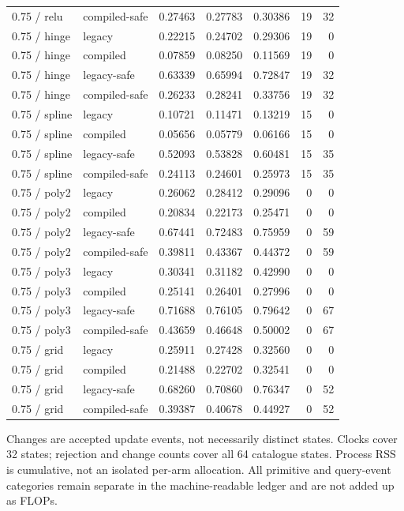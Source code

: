 \begin{longtable}{@{}llrrrrr@{}}
0.75 / relu & compiled-safe & 0.27463 & 0.27783 & 0.30386 & 19 & 32\\
0.75 / hinge & legacy & 0.22215 & 0.24702 & 0.29306 & 19 & 0\\
0.75 / hinge & compiled & 0.07859 & 0.08250 & 0.11569 & 19 & 0\\
0.75 / hinge & legacy-safe & 0.63339 & 0.65994 & 0.72847 & 19 & 32\\
0.75 / hinge & compiled-safe & 0.26233 & 0.28241 & 0.33756 & 19 & 32\\
0.75 / spline & legacy & 0.10721 & 0.11471 & 0.13219 & 15 & 0\\
0.75 / spline & compiled & 0.05656 & 0.05779 & 0.06166 & 15 & 0\\
0.75 / spline & legacy-safe & 0.52093 & 0.53828 & 0.60481 & 15 & 35\\
0.75 / spline & compiled-safe & 0.24113 & 0.24601 & 0.25973 & 15 & 35\\
0.75 / poly2 & legacy & 0.26062 & 0.28412 & 0.29096 & 0 & 0\\
0.75 / poly2 & compiled & 0.20834 & 0.22173 & 0.25471 & 0 & 0\\
0.75 / poly2 & legacy-safe & 0.67441 & 0.72483 & 0.75959 & 0 & 59\\
0.75 / poly2 & compiled-safe & 0.39811 & 0.43367 & 0.44372 & 0 & 59\\
0.75 / poly3 & legacy & 0.30341 & 0.31182 & 0.42990 & 0 & 0\\
0.75 / poly3 & compiled & 0.25141 & 0.26401 & 0.27996 & 0 & 0\\
0.75 / poly3 & legacy-safe & 0.71688 & 0.76105 & 0.79642 & 0 & 67\\
0.75 / poly3 & compiled-safe & 0.43659 & 0.46648 & 0.50002 & 0 & 67\\
0.75 / grid & legacy & 0.25911 & 0.27428 & 0.32560 & 0 & 0\\
0.75 / grid & compiled & 0.21488 & 0.22702 & 0.32541 & 0 & 0\\
0.75 / grid & legacy-safe & 0.68260 & 0.70860 & 0.76347 & 0 & 52\\
0.75 / grid & compiled-safe & 0.39387 & 0.40678 & 0.44927 & 0 & 52\\
\bottomrule\end{longtable}\endgroup
Changes are accepted update events, not necessarily distinct states. Clocks cover 32 states; rejection and change counts cover all 64 catalogue states. Process RSS is cumulative, not an isolated per-arm allocation. All primitive and query-event categories remain separate in the machine-readable ledger and are not added up as FLOPs.
